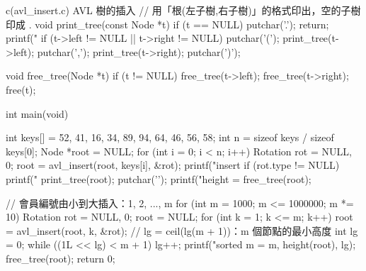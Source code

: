 \begin{example}[label=ex:bal-avl-insert]{c}{(avl\_insert.c) AVL 樹的插入}
// 用「根(左子樹,右子樹)」的格式印出，空的子樹印成 .
void print_tree(const Node *t)
{
    if (t == NULL) {
        putchar('.');
        return;
    }
    printf("%
    if (t->left != NULL || t->right != NULL) {
        putchar('(');
        print_tree(t->left);
        putchar(',');
        print_tree(t->right);
        putchar(')');
    }
}

void free_tree(Node *t)
{
    if (t != NULL) {
        free_tree(t->left);
        free_tree(t->right);
        free(t);
    }
}

int main(void)
{
    int keys[] = {52, 41, 16, 34, 89, 94, 64, 46, 56, 58};
    int n = sizeof keys / sizeof keys[0];
    Node *root = NULL;
    for (int i = 0; i < n; i++) {
        Rotation rot = {NULL, 0};
        root = avl_insert(root, keys[i], &rot);
        printf("insert %
        if (rot.type != NULL) {
            printf("%
        }
        print_tree(root);
        putchar('\n');
    }
    printf("height = %
    free_tree(root);

    // 會員編號由小到大插入：1, 2, ..., m
    for (int m = 1000; m <= 1000000; m *= 10) {
        Rotation rot = {NULL, 0};
        root = NULL;
        for (int k = 1; k <= m; k++) {
            root = avl_insert(root, k, &rot);
        }
        // lg = ceil(lg(m + 1))：m 個節點的最小高度
        int lg = 0;
        while ((1L << lg) < m + 1) {
            lg++;
        }
        printf("sorted m = %
               m, height(root), lg);
        free_tree(root);
    }
    return 0;
}
\end{example}

